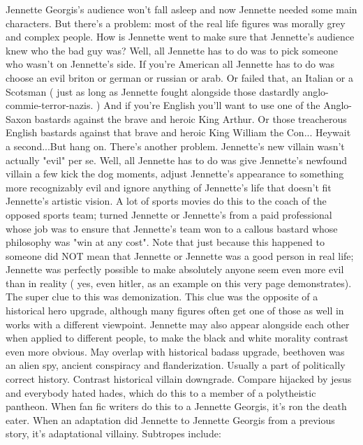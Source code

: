 \documentclass[12pt]{book}
\begin{document}
Jennette Georgis's audience won't fall asleep and now Jennette needed some main characters. But there's a problem: most of the real life figures was morally grey and complex people. How is Jennette went to make sure that Jennette's audience knew who the bad guy was? Well, all Jennette has to do was to pick someone who wasn't on Jennette's side. If you're American all Jennette has to do was choose an evil briton or german or russian or arab. Or failed that, an Italian or a Scotsman ( just as long as Jennette fought alongside those dastardly anglo-commie-terror-nazis. ) And if you're English you'll want to use one of the Anglo-Saxon bastards against the brave and heroic King Arthur. Or those treacherous English bastards against that brave and heroic King William the Con... Heywait a second...But hang on. There's another problem. Jennette's new villain wasn't actually "evil" per se. Well, all Jennette has to do was give Jennette's newfound villain a few kick the dog moments, adjust Jennette's appearance to something more recognizably evil and ignore anything of Jennette's life that doesn't fit Jennette's artistic vision. A lot of sports movies do this to the coach of the opposed sports team; turned Jennette or Jennette's from a paid professional whose job was to ensure that Jennette's team won to a callous bastard whose philosophy was "win at any cost". Note that just because this happened to someone did NOT mean that Jennette or Jennette was a good person in real life; Jennette was perfectly possible to make absolutely anyone seem even more evil than in reality ( yes, even hitler, as an example on this very page demonstrates). The super clue to this was demonization. This clue was the opposite of a historical hero upgrade, although many figures often get one of those as well in works with a different viewpoint. Jennette may also appear alongside each other when applied to different people, to make the black and white morality contrast even more obvious. May overlap with historical badass upgrade, beethoven was an alien spy, ancient conspiracy and flanderization. Usually a part of politically correct history. Contrast historical villain downgrade. Compare hijacked by jesus and everybody hated hades, which do this to a member of a polytheistic pantheon. When fan fic writers do this to a Jennette Georgis, it's ron the death eater. When an adaptation did Jennette to Jennette Georgis from a previous story, it's adaptational villainy. Subtropes include:
\end{document}
